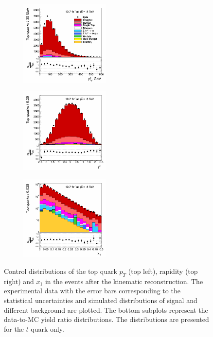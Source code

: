 \begin{figure}[h]
\centering
\begin{subfigure}
  \centering
  \includegraphics[width=0.49\textwidth]{05_kinReco/plots/CP_top_pt.png}
\end{subfigure}
\begin{subfigure}
  \centering
  \includegraphics[width=0.49\textwidth]{05_kinReco/plots/CP_top_rapidity.png}
\end{subfigure}
\begin{subfigure}
  \centering
  \includegraphics[width=0.49\textwidth]{05_kinReco/plots/CP_x1.png}
\end{subfigure}
\caption{Control distributions of the top quark $p_{T}$ (top left), rapidity (top right) and  $x_{1}$ in the events 
 after the kinematic reconstruction. The experimental data with the error bars corresponding to the statistical uncertainties
 and simulated distributions of signal and different background are plotted. The bottom subplots represent the data-to-MC yield ratio distributions. 
 The distributions are presented for the $t$ quark only.}
\label{fig:CPkinTop}
\end{figure}

